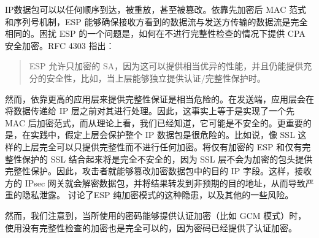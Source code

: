 \begin{snote}[安全性。]
IP数据包可以以任何顺序到达，被重放，甚至被篡改。依靠先加密后 MAC 范式和序列号机制，ESP 能够确保接收方看到的数据流与发送方传输的数据流是完全相同的。困扰 ESP 的一个问题是，如何在不进行完整性检查的情况下提供 CPA 安全加密。RFC 4303 指出：
\begin{quote}
ESP 允许只加密的 SA，因为这可以提供相当优异的性能，并且仍能提供充分的安全性，比如，当上层能够独立提供认证/完整性保护时。
\end{quote}
然而，依靠更高的应用层来提供完整性保证是相当危险的。在发送端，应用层会在将数据传递给 IP 层之前对其进行处理。因此，这事实上等于是实现了一个先 MAC 后加密范式，而从理论上看，我们已经知道，它可能是不安全的。更重要的是，在实践中，假定上层会保护整个 IP 数据包是很危险的。比如说，像 SSL 这样的上层完全可以只提供完整性而不进行任何加密。将仅有加密的 ESP 和仅有完整性保护的 SSL 结合起来将是完全不安全的，因为 SSL 层不会为加密的包头提供完整性保护。因此，攻击者就能够篡改加密数据包中的目的 IP 字段。这样，接收方的 IPsec 网关就会解密数据包，并将结果转发到非预期的目的地址，从而导致严重的隐私泄露。\cite{bellovin1996problem,paterson2006cryptography} 讨论了ESP 纯加密模式的这种隐患，以及其他的一些风险。

然而，我们注意到，当所使用的密码能够提供认证加密（比如 GCM 模式）时，使用没有完整性检查的加密也是完全可以的，因为密码已经提供了认证加密。
\end{snote}
